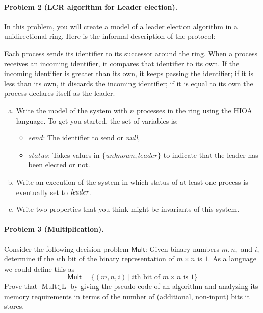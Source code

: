 \documentclass[11pt]{article}
\begin{document}
\paragraph{Problem 2 (LCR algorithm for Leader election).}
In this problem, you will create a model of a leader election algorithm in a unidirectional ring. Here is the informal description of the protocol:

Each process sends its identifier to its successor around the ring. When a process receives an incoming identifier, it compares that identifier to its own. If the incoming identifier is greater than its own, it keeps passing the identifier; if it is less than its own, it discards the incoming identifier; if it is equal to its own the process declares itself as the leader. 

\begin{enumerate}[(a)]
\item Write the model of the system with $n$ processes in the ring using the HIOA language. To get you started, the set of variables is: 
\begin{itemize}
\item $\mathit{send}$: The identifier to send or {\em null\/},
\item $\mathit{status}$: Takes values in $\{ \mathit{unknown},\mathit{leader}\}$ to indicate that the leader has been elected or not. 
\end{itemize}

\item Write an execution of the system in which status of at least one process is eventually set to $\mathit{leader\/}$. 
\item Write two properties that you think might be invariants of this system.
\end{enumerate}


\paragraph{Problem 3 (Multiplication).} 
Consider the following decision problem $\mathsf{Mult}$: Given binary
numbers $m,n,$ and $i$, determine if the $i$th bit of the binary
representation of $m\times n$ is $1$. As a language we could define
this as
\[
\mathsf{Mult} = \{(m,n,i)\: |\: \mbox{$i$th bit of $m\times n$ is $1$}\}
\]
Prove that $\mbox{Mult} \in \mbox{L}$ by giving the pseudo-code of an
algorithm and analyzing its memory requirements in terms of the number
of (additional, non-input) bits it stores.
\end{document}
